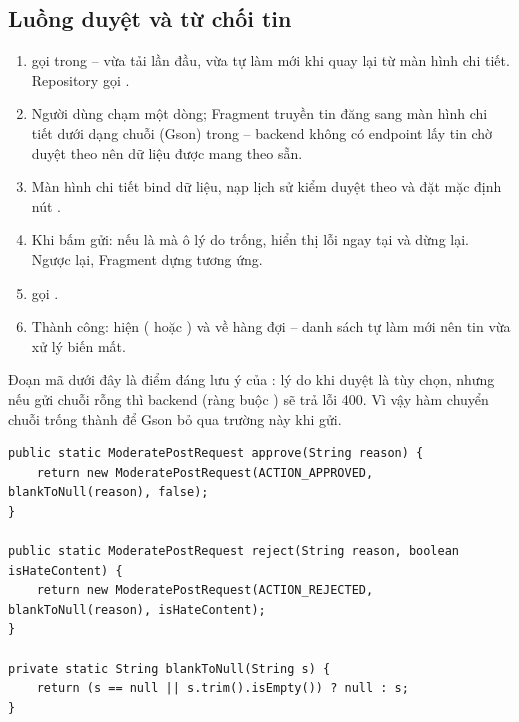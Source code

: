 \subsection{Luồng duyệt và từ chối tin}
\begin{enumerate}
    \item {} gọi  trong
     -- vừa tải lần đầu, vừa tự làm mới khi quay lại từ màn
    hình chi tiết. Repository gọi .
    \item Người dùng chạm một dòng; Fragment truyền tin đăng sang màn hình chi
    tiết dưới dạng chuỗi  (Gson) trong  -- backend không
    có endpoint lấy tin chờ duyệt theo  nên dữ liệu được mang theo
    sẵn.
    \item Màn hình chi tiết bind dữ liệu, nạp lịch sử kiểm duyệt theo
     và đặt mặc định nút .
    \item Khi bấm gửi: nếu là  mà ô lý do trống, hiển thị lỗi
    ngay tại  và dừng lại. Ngược lại, Fragment dựng
     tương ứng.
    \item {} gọi
    .
    \item Thành công: hiện  ( hoặc
    ) và  về hàng đợi -- danh
    sách tự làm mới nên tin vừa xử lý biến mất.
\end{enumerate}

Đoạn mã dưới đây là điểm đáng lưu ý của : lý do khi
duyệt là tùy chọn, nhưng nếu gửi chuỗi rỗng thì backend (ràng buộc
) sẽ trả lỗi 400. Vì vậy hàm  chuyển
chuỗi trống thành  để Gson bỏ qua trường này khi gửi.

\begin{lstlisting}[caption={Dựng yêu cầu kiểm duyệt -- chuẩn hóa lý do trống về null}, label={lst:c6_moderate}]
public static ModeratePostRequest approve(String reason) {
    return new ModeratePostRequest(ACTION_APPROVED, blankToNull(reason), false);
}

public static ModeratePostRequest reject(String reason, boolean isHateContent) {
    return new ModeratePostRequest(ACTION_REJECTED, blankToNull(reason), isHateContent);
}

private static String blankToNull(String s) {
    return (s == null || s.trim().isEmpty()) ? null : s;
}
\end{lstlisting}

